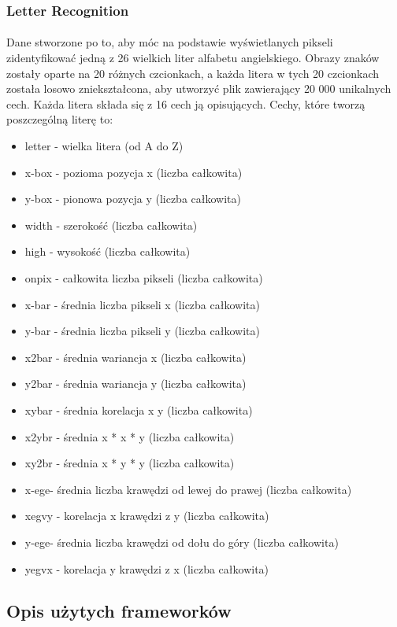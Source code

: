 \documentclass[a4paper,11pt]{article}
\begin{document}
\subsubsection{Letter Recognition}
\paragraph{}Dane stworzone po to, aby móc na podstawie wyświetlanych pikseli zidentyfikować jedną z 26 wielkich liter alfabetu angielskiego. Obrazy znaków zostały oparte na 20 różnych czcionkach, a każda litera w tych 20 czcionkach została losowo zniekształcona, aby utworzyć plik zawierający 20 000 unikalnych cech. Każda litera składa się z 16 cech ją opisujących. Cechy, które tworzą poszczególną literę to:
\begin{itemize}
\item letter - wielka litera (od A do Z)
\item x-box - pozioma pozycja x (liczba całkowita)
\item y-box - pionowa pozycja y (liczba całkowita)
\item width - szerokość (liczba całkowita)
\item high - wysokość (liczba całkowita)
\item onpix - całkowita liczba pikseli (liczba całkowita)
\item x-bar - średnia liczba pikseli x (liczba całkowita) 
\item y-bar - średnia liczba pikseli y (liczba całkowita) 
\item x2bar - średnia wariancja x (liczba całkowita) 
\item y2bar - średnia wariancja y (liczba całkowita) 
\item xybar - średnia korelacja x y (liczba całkowita) 
\item x2ybr - średnia x * x * y (liczba całkowita) 
\item xy2br - średnia x * y * y (liczba całkowita) 
\item x-ege- średnia liczba krawędzi od lewej do prawej (liczba całkowita) 
\item xegvy - korelacja x krawędzi z y (liczba całkowita) 
\item y-ege- średnia liczba krawędzi od dołu do góry (liczba całkowita)
\item yegvx - korelacja y krawędzi z x (liczba całkowita)
\end{itemize}
\subsection{Opis użytych frameworków}
\end{document}
